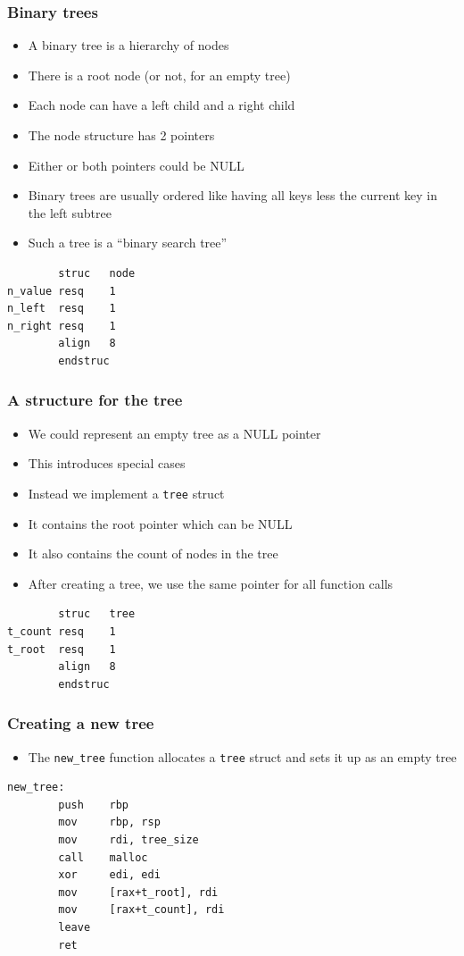 \documentclass{beamer}
\begin{document}
\begin{frame}[fragile]
    \frametitle{Binary trees}
    \begin{itemize}
        \item A binary tree is a hierarchy of nodes
        \item There is a root node (or not, for an empty tree)
        \item Each node can have a left child and a right child
        \item The node structure has 2 pointers
        \item Either or both pointers could be NULL
        \item Binary trees are usually ordered like having all keys less
              the current key in the left subtree
        \item Such a tree is a ``binary search tree''
    \end{itemize}
\begin{verbatim}
        struc   node
n_value resq    1
n_left  resq    1
n_right resq    1
        align   8
        endstruc
\end{verbatim}
\end{frame}

\begin{frame}[fragile]
    \frametitle{A structure for the tree}
    \begin{itemize}
        \item We could represent an empty tree as a NULL pointer
        \item This introduces special cases
        \item Instead we implement a {\tt tree} struct
        \item It contains the root pointer which can be NULL
        \item It also contains the count of nodes in the tree
        \item After creating a tree, we use the same pointer
              for all function calls
    \end{itemize}

\begin{verbatim}
        struc   tree
t_count resq    1
t_root  resq    1
        align   8
        endstruc
\end{verbatim}
\end{frame}

\begin{frame}[fragile]
    \frametitle{Creating a new tree}
    \begin{itemize}
        \item The {\tt new\_tree} function allocates a {\tt tree}
              struct and sets it up as an empty tree
    \end{itemize}
\begin{verbatim}
new_tree:
        push    rbp
        mov     rbp, rsp
        mov     rdi, tree_size
        call    malloc
        xor     edi, edi
        mov     [rax+t_root], rdi
        mov     [rax+t_count], rdi
        leave
        ret
\end{verbatim}
\end{frame}
\end{document}
